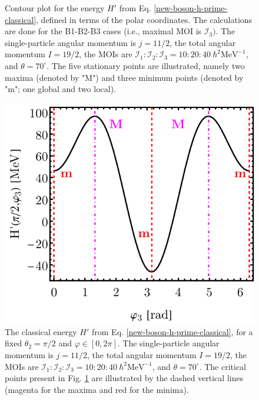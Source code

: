 \begin{figure}
\begin{center}
        \caption{Contour plot for the energy $H'$ from Eq. \ref{new-boson-h-prime-classical}, defined in terms of the polar coordinates. The calculations are done for the B1-B2-B3 cases (i.e., maximal MOI is $\mathcal{I}_3)$. The single-particle angular momentum is $j=11/2$, the total angular momentum $I=19/2$, the MOIs are $\mathcal{I}_1:\mathcal{I}_2:\mathcal{I}_3=10:20:40\ \hbar^2\text{MeV}^{-1}$, and $\theta=70^\circ$. The five stationary points are illustrated, namely two maxima (denoted by "M") and three minimum points (denoted by "m"; one global and two local).}
        \label{new-boson-hprime-3axis-contour-plot}
    \end{center}
\end{figure}
\begin{figure}
    \begin{center}
        \includegraphics[scale=0.8]{Chapters/Figures/New-Boson-Classical-H-3-axis-varphi-plot.pdf}
        \caption{The classical energy $H'$ from Eq. \ref{new-boson-h-prime-classical}, for a fixed $\theta_2=\pi/2$ and $\varphi\in[0,2\pi]$. The single-particle angular momentum is $j=11/2$, the total angular momentum $I=19/2$, the MOIs are $\mathcal{I}_1:\mathcal{I}_2:\mathcal{I}_3=10:20:40\ \hbar^2\text{MeV}^{-1}$, and $\theta=70^\circ$. The critical points present in Fig. \ref{new-boson-hprime-3axis-contour-plot} are illustrated by the dashed vertical lines (magenta for the maxima and red for the minima).}
        \label{new-boson-hprime-3axis-varphi-plot}
    \end{center}
\end{figure}

